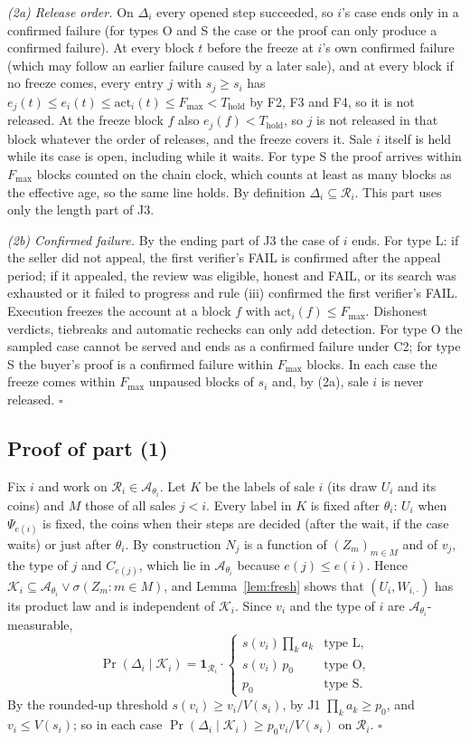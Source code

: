 \documentclass[10pt,a4paper]{article}
\newcommand{\Thold}{T_{\mathrm{hold}}}
\newcommand{\Fmax}{F_{\max}}
\newcommand{\cA}{\mathcal{A}}
\newcommand{\cK}{\mathcal{K}}
\newcommand{\cR}{\mathcal{R}}
\newcommand{\one}{\mathbf{1}}
\theoremstyle{plain}
\theoremstyle{remark}
\begin{document}
\emph{(2a) Release order.} On $\Delta_i$ every opened step succeeded, so $i$'s case ends only in a confirmed failure (for types O and S the case or the proof can only produce a confirmed failure). At every block $t$ before the freeze at $i$'s own confirmed failure (which may follow an earlier failure caused by a later sale), and at every block if no freeze comes, every entry $j$ with $s_j\ge s_i$ has $e_j(t)\le e_i(t)\le\mathrm{act}_i(t)\le\Fmax<\Thold$ by F2, F3 and F4, so it is not released. At the freeze block $f$ also $e_j(f)<\Thold$, so $j$ is not released in that block whatever the order of releases, and the freeze covers it. Sale $i$ itself is held while its case is open, including while it waits. For type S the proof arrives within $\Fmax$ blocks counted on the chain clock, which counts at least as many blocks as the effective age, so the same line holds. By definition $\Delta_i\subseteq\cR_i$. This part uses only the length part of J3.

\emph{(2b) Confirmed failure.} By the ending part of J3 the case of $i$ ends. For type L: if the seller did not appeal, the first verifier's FAIL is confirmed after the appeal period; if it appealed, the review was eligible, honest and FAIL, or its search was exhausted or it failed to progress and rule (iii) confirmed the first verifier's FAIL. Execution freezes the account at a block $f$ with $\mathrm{act}_i(f)\le\Fmax$. Dishonest verdicts, tiebreaks and automatic rechecks can only add detection. For type O the sampled case cannot be served and ends as a confirmed failure under C2; for type S the buyer's proof is a confirmed failure within $\Fmax$ blocks. In each case the freeze comes within $\Fmax$ unpaused blocks of $s_i$ and, by (2a), sale $i$ is never released. \hfill$\square$

\subsection{Proof of part (1)}

Fix $i$ and work on $\cR_i\in\cA_{\theta_i}$. Let $K$ be the labels of sale $i$ (its draw $U_i$ and its coins) and $M$ those of all sales $j<i$. Every label in $K$ is fixed after $\theta_i$: $U_i$ when $\Psi_{e(i)}$ is fixed, the coins when their steps are decided (after the wait, if the case waits) or just after $\theta_i$. By construction $N_j$ is a function of $(Z_m)_{m\in M}$ and of $v_j$, the type of $j$ and $C_{e(j)}$, which lie in $\cA_{\theta_i}$ because $e(j)\le e(i)$. Hence $\cK_i\subseteq\cA_{\theta_i}\vee\sigma(Z_m:m\in M)$, and Lemma~\ref{lem:fresh} shows that $(U_i,W_{i,\cdot})$ has its product law and is independent of $\cK_i$. Since $v_i$ and the type of $i$ are $\cA_{\theta_i}$-measurable,
\[
\Pr(\Delta_i\mid\cK_i)=\one_{\cR_i}\cdot\begin{cases}s(v_i)\prod_ka_k & \text{type L},\\ s(v_i)\,p_0 & \text{type O},\\ p_0 & \text{type S}.\end{cases}
\]
By the rounded-up threshold $s(v_i)\ge v_i/V(s_i)$, by J1 $\prod_ka_k\ge p_0$, and $v_i\le V(s_i)$; so in each case $\Pr(\Delta_i\mid\cK_i)\ge p_0v_i/V(s_i)$ on $\cR_i$. \hfill$\square$
\end{document}
